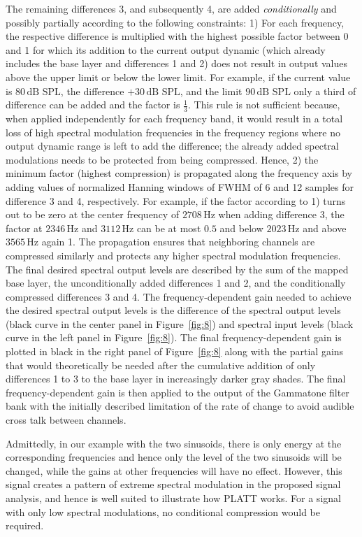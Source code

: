 \documentclass[10pt,a4paper,twocolumn]{article}
\begin{document}
The remaining differences 3, and subsequently 4, are added \emph{conditionally} and possibly partially according to the following constraints:
%
1) For each frequency, the respective difference is multiplied with the highest possible factor between 0 and 1 for which its addition to the current output dynamic (which already includes the base layer and differences 1 and 2) does not result in output values above the upper limit or below the lower limit.
%
For example, if the current value is $80\,\text{dB~SPL}$, the difference $+30\,\text{dB~SPL}$, and the limit $90\,\text{dB~SPL}$ only a third of difference can be added and the factor is $\frac{1}{3}$.
%
This rule is not sufficient because, when applied independently for each frequency band, it would result in a total loss of high spectral modulation frequencies in the frequency regions where no output dynamic range is left to add the difference; the already added spectral modulations needs to be protected from being compressed.
%
Hence, 2) the minimum factor (highest compression) is propagated along the frequency axis by adding values of normalized Hanning windows of FWHM of 6 and 12 samples for difference 3 and 4, respectively.
%
For example, if the factor according to 1) turns out to be zero at the center frequency of $2708\,\text{Hz}$ when adding difference 3, the factor at $2346\,\text{Hz}$ and $3112\,\text{Hz}$ can be at most $0.5$ and below $2023\,\text{Hz}$ and above $3565\,\text{Hz}$ again 1.
%
The propagation ensures that neighboring channels are compressed similarly and protects any higher spectral modulation frequencies.
%
The final desired spectral output levels are described by the sum of the mapped base layer, the unconditionally added differences 1 and 2, and the conditionally compressed differences 3 and 4.
%
The frequency-dependent gain needed to achieve the desired spectral output levels is the difference of the spectral output levels (black curve in the center panel in Figure~\ref{fig:8}) and spectral input levels (black curve in the left panel in Figure~\ref{fig:8}).
%
The final frequency-dependent gain is plotted in black in the right panel of Figure~\ref{fig:8} along with the partial gains that would theoretically be needed after the cumulative addition of only differences 1 to 3 to the base layer in increasingly darker gray shades.
%
The final frequency-dependent gain is then applied to the output of the Gammatone filter bank with the initially described limitation of the rate of change to avoid audible cross talk between channels.

Admittedly, in our example with the two sinusoids, there is only energy at the corresponding frequencies and hence only the level of the two sinusoids will be changed, while the gains at other frequencies will have no effect.
%
However, this signal creates a pattern of extreme spectral modulation in the proposed signal analysis, and hence is well suited to illustrate how PLATT works.
%
For a signal with only low spectral modulations, no conditional compression would be required.
\end{document}

